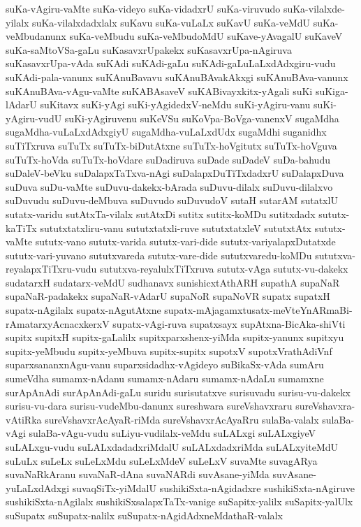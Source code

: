 {suKa-vAgiru-vaMte
suKa-videyo
suKa-vidadxrU
suKa-viruvudo
suKa-vilalxde-yilalx
suKa-vilalxdadxlalx
suKavu
suKa-vuLaLx
suKavU
suKa-veMdU
suKa-veMbudanunx
suKa-veMbudu
suKa-veMbudoMdU
suKave-yAvagalU
suKaveV
suKa-saMtoVSa-gaLu
suKasavxrUpakekx
suKasavxrUpa-nAgiruva
suKasavxrUpa-vAda
suKAdi
suKAdi-gaLu
suKAdi-gaLuLaLxdAdxgiru-vudu
suKAdi-pala-vanunx
suKAnuBavavu
suKAnuBAvakAkxgi
suKAnuBAva-vanunx
suKAnuBAva-vAgu-vaMte
suKABAsaveV
suKABivayxkitx-yAgali
suKi
suKiga-lAdarU
suKitavx
suKi-yAgi
suKi-yAgidedxV-neMdu
suKi-yAgiru-vanu
suKi-yAgiru-vudU
suKi-yAgiruvenu
suKeVSu
suKoVpa-BoVga-vanenxV
sugaMdha
sugaMdha-vuLaLxdAdxgiyU
sugaMdha-vuLaLxdUdx
sugaMdhi
suganidhx
suTiTxruva
suTuTx
suTuTx-biDutAtxne
suTuTx-hoVgitutx
suTuTx-hoVguva
suTuTx-hoVda
suTuTx-hoVdare
suDadiruva
suDade
suDadeV
suDa-bahudu
suDaleV-beVku
suDalapxTaTxva-nAgi
suDalapxDuTiTxdadxrU
suDalapxDuva
suDuva
suDu-vaMte
suDuvu-dakekx-bArada
suDuvu-dilalx
suDuvu-dilalxvo
suDuvudu
suDuvu-deMbuva
suDuvudo
suDuvudoV
sutaH
sutarAM
sutatxlU
sutatx-varidu
sutAtxTa-vilalx
sutAtxDi
sutitx
sutitx-koMDu
sutitxdadx
sututx-kaTiTx
sututxtatxliru-vanu
sututxtatxli-ruve
sututxtatxleV
sututxtAtx
sututx-vaMte
sututx-vano
sututx-varida
sututx-vari-dide
sututx-variyalapxDutatxde
sututx-vari-yuvano
sututxvareda
sututx-vare-dide
sututxvaredu-koMDu
sututxva-reyalapxTiTxru-vudu
sututxva-reyalulxTiTxruva
sututx-vAga
sututx-vu-dakekx
sudatarxH
sudatarx-veMdU
sudhanavx
sunishicxtAthARH
supathA
supaNaR
supaNaR-padakekx
supaNaR-vAdarU
supaNoR
supaNoVR
supatx
supatxH
supatx-nAgilalx
supatx-nAgutAtxne
supatx-mAjagamxtusatx-meVteYnARmaBi-rAmatarxyAcnacxkerxV
supatx-vAgi-ruva
supatxsayx
supAtxna-BicAka-shiVti
supitx
supitxH
supitx-gaLalilx
supitxparxshenx-yiMda
supitx-yanunx
supitxyu
supitx-yeMbudu
supitx-yeMbuva
supitx-supitx
supotxV
supotxVrathAdiVnf
suparxsananxnAgu-vanu
suparxsidadhx-vAgideyo
suBikaSx-vAda
sumAru
sumeVdha
sumamx-nAdanu
sumamx-nAdaru
sumamx-nAdaLu
sumamxne
surApAnAdi
surApAnAdi-gaLu
suridu
surisutatxve
surisuvadu
surisu-vu-dakekx
surisu-vu-dara
surisu-vudeMbu-danunx
sureshwara
sureVshavxraru
sureVshavxra-vAtiRka
sureVshavxrAcAyaR-riMda
sureVshavxrAcAyaRru
sulaBa-valalx
sulaBa-vAgi
sulaBa-vAgu-vudu
suLiyu-vudilalx-veMdu
suLALxgi
suLALxgiyeV
suLALxgu-vudu
suLALxdadadxriMdalU
suLALxdadxriMda
suLALxyiteMdU
suLuLx
suLeLx
suLeLxMdu
suLeLxMdeV
suLeLxV
suvaMte
suvagARya
suvaNaRkAranu
suvaNaR-dAna
suvaNARdi
suvAsane-yiMda
suvAsane-yuLaLxdAdxgi
suvaqSiTx-yiMdalU
sushikiSxta-nAgidadxre
sushikiSxta-nAgiruve
sushikiSxta-nAgilalx
sushikiSxsalapxTaTx-vanige
suSapitx-yalilx
suSapitx-yalUlx
suSupatx
suSupatx-nalilx
suSupatx-nAgidAdxneMdathaR-valalx
}
